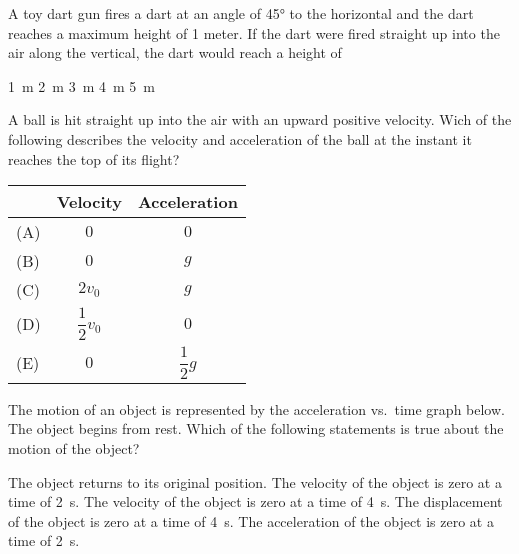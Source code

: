 \documentclass{../../../oss-ap12ibhl-print}
\begin{document}
\begin{questions}
  \question A toy dart gun fires a dart at an angle of \ang{45} to the
  horizontal and the dart reaches a maximum height of 1 meter. If the dart
  were fired straight up into the air along the vertical, the dart would
  reach a height of
  \begin{choices}
    \choice\SI{1}{\metre}
    \choice\SI{2}{\metre}
    \choice\SI{3}{\metre}
    \choice\SI{4}{\metre}
    \choice\SI{5}{\metre}
  \end{choices}

  \question A ball is hit straight up into the air with an upward positive
  velocity. Wich of the following describes the velocity and acceleration
  of the ball at the instant it reaches the top of its flight?
  
  \begin{tabular}{lcc}
    & Velocity & Acceleration\\ \hline
    (A) & $0$ & $0$\\
    (B) & $0$ & $g$\\
    (C) & $2v_0$ & $g$\\
    (D) & $\dfrac12v_0$ & $0$\\
    (E) & $0$ & $\dfrac12g$
  \end{tabular}
  \newpage
  
  \question The motion of an object is represented by the acceleration vs.\ time
  graph below. The object begins from rest. Which of the following statements
  is true about the motion of the object?

  \begin{minipage}{.3\linewidth}
  \end{minipage}
  \begin{minipage}{.6\linewidth}
    \begin{choices}
      \choice The object returns to its original position.
      \choice The velocity of the object is zero at a time of \SI{2}{\second}.
      \choice The velocity of the object is zero at a time of \SI{4}{\second}.
      \choice The displacement of the object is zero at a time of
      \SI{4}{\second}.
      \choice The acceleration of the object is zero at a time of
      \SI{2}{\second}.
    \end{choices}
  \end{minipage}
  \newpage
  

\end{questions}
\end{document}
